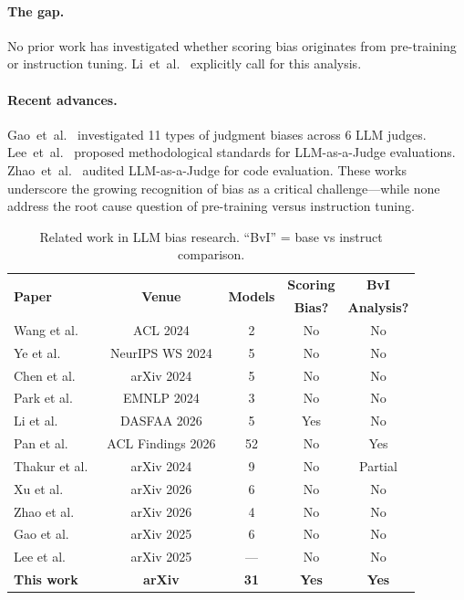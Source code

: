 \documentclass[11pt,twocolumn]{article}
\begin{document}
\paragraph{The gap.}
No prior work has investigated whether scoring bias originates from pre-training or instruction tuning. Li~et~al.~\cite{li2025scoring} explicitly call for this analysis.

\paragraph{Recent advances.}
Gao~et~al.~\cite{gao2025evaluating} investigated 11 types of judgment biases across 6 LLM judges. Lee~et~al.~\cite{lee2025correctly} proposed methodological standards for LLM-as-a-Judge evaluations. Zhao~et~al.~\cite{zhao2026bias} audited LLM-as-a-Judge for code evaluation. These works underscore the growing recognition of bias as a critical challenge---while none address the root cause question of pre-training versus instruction tuning.

\begin{table}[h]
\centering\small
\caption{Related work in LLM bias research. ``BvI'' = base vs instruct comparison.}
\label{tab:related}
\begin{tabular}{lcccc}
\toprule
\multirow{2}{*}{\textbf{Paper}} & \multirow{2}{*}{\textbf{Venue}} & \multirow{2}{*}{\textbf{Models}} & \textbf{Scoring} & \textbf{BvI} \\
& & & \textbf{Bias?} & \textbf{Analysis?} \\
\midrule
Wang et al.~\cite{wang2023large} & ACL 2024 & 2 & No & No \\
Ye et al.~\cite{ye2024justice} & NeurIPS WS 2024 & 5 & No & No \\
Chen et al.~\cite{chen2024humans} & arXiv 2024 & 5 & No & No \\
Park et al.~\cite{park2024offsetbias} & EMNLP 2024 & 3 & No & No \\
Li et al.~\cite{li2025scoring} & DASFAA 2026 & 5 & Yes & No \\
Pan et al.~\cite{pan2025user} & ACL Findings 2026 & 52 & No & Yes \\
Thakur et al.~\cite{thakur2024judging} & arXiv 2024 & 9 & No & Partial \\
Xu et al.~\cite{xu2026position} & arXiv 2026 & 6 & No & No \\
Zhao et al.~\cite{zhao2026bias} & arXiv 2026 & 4 & No & No \\
Gao et al.~\cite{gao2025evaluating} & arXiv 2025 & 6 & No & No \\
Lee et al.~\cite{lee2025correctly} & arXiv 2025 & --- & No & No \\
\midrule
\textbf{This work} & \textbf{arXiv} & \textbf{31} & \textbf{Yes} & \textbf{Yes} \\
\bottomrule
\end{tabular}
\end{table}
\end{document}
